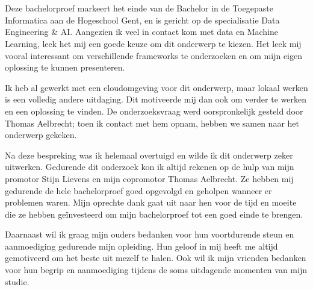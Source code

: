 
\chapter*{}%
\label{ch:voorwoord}
Deze bachelorproef markeert het einde van de Bachelor in de Toegepaste Informatica aan de Hogeschool Gent, en is gericht op de specialisatie Data Engineering \& AI. Aangezien ik veel in contact kom met data en Machine Learning, leek het mij een goede keuze om dit onderwerp te kiezen. Het leek mij vooral interessant om verschillende frameworks te onderzoeken en om mijn eigen oplossing te kunnen presenteren.

Ik heb al gewerkt met een cloudomgeving voor dit onderwerp, maar lokaal werken is een volledig andere uitdaging. Dit motiveerde mij dan ook om verder te werken en een oplossing te vinden. De onderzoeksvraag werd oorspronkelijk gesteld door Thomas Aelbrecht; toen ik contact met hem opnam, hebben we samen naar het onderwerp gekeken.

Na deze bespreking was ik helemaal overtuigd en wilde ik dit onderwerp zeker uitwerken. Gedurende dit onderzoek kon ik altijd rekenen op de hulp van mijn promotor Stijn Lievens en mijn copromotor Thomas Aelbrecht. Ze hebben mij gedurende de hele bachelorproef goed opgevolgd en geholpen wanneer er problemen waren. Mijn oprechte dank gaat uit naar hen voor de tijd en moeite die ze hebben geïnvesteerd om mijn bachelorproef tot een goed einde te brengen.

Daarnaast wil ik graag mijn ouders bedanken voor hun voortdurende steun en aanmoediging gedurende mijn opleiding. Hun geloof in mij heeft me altijd gemotiveerd om het beste uit mezelf te halen. Ook wil ik mijn vrienden bedanken voor hun begrip en aanmoediging tijdens de soms uitdagende momenten van mijn studie.



